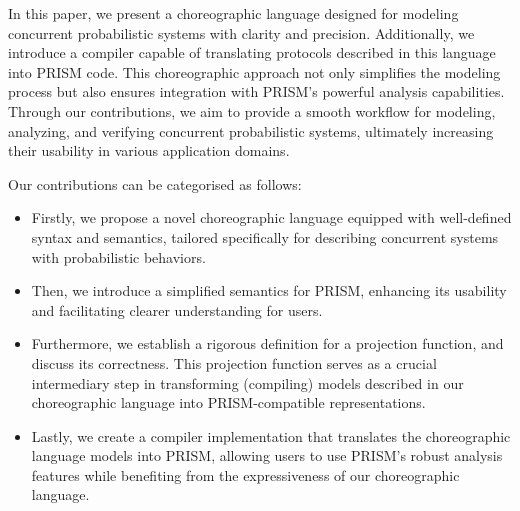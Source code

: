 In this paper, we present a choreographic language designed for
modeling concurrent probabilistic systems with clarity and
precision. Additionally, we introduce a compiler capable of
translating protocols described in this language into PRISM code. This
choreographic approach not only simplifies the modeling process but
also ensures integration with PRISM's powerful analysis
capabilities. Through our contributions, we aim to provide a smooth
workflow for modeling, analyzing, and verifying concurrent
probabilistic systems, ultimately increasing their usability in
various application domains.

 Our contributions can be
categorised as follows:
\begin{itemize} 
\item Firstly, we propose a novel choreographic language equipped with
  well-defined syntax and semantics, tailored specifically for
  describing concurrent systems with probabilistic behaviors.
\item Then, we introduce a simplified semantics for PRISM, enhancing
  its usability and facilitating clearer understanding for users.
\item Furthermore, we establish a rigorous definition for a projection
  function, and discuss its correctness. This projection function
  serves as a crucial intermediary step in transforming (compiling)
  models described in our choreographic language into PRISM-compatible
  representations.
\item Lastly, we create a compiler implementation that translates the
  choreographic language models into PRISM, allowing users to use
  PRISM's robust analysis features while benefiting from the
  expressiveness of our choreographic language.
\end{itemize}



